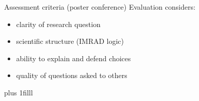 \documentclass[aspectratio=169]{beamer}
\newcommand{\btVFill}{\vskip0pt plus 1filll}
\begin{document}
\begin{frame}{Assessment criteria (poster conference)}
  Evaluation considers:
  \begin{itemize}
    \item clarity of research question
    \item scientific structure (IMRAD logic)
    \item ability to explain and defend choices
    \item quality of questions asked to others
  \end{itemize}
\btVFill
\end{frame}
\end{document}
